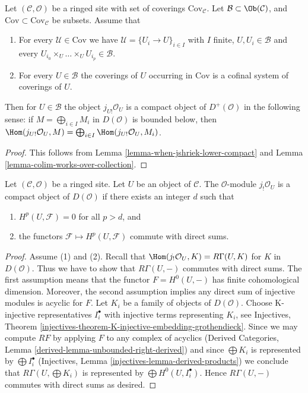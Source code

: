 \begin{lemma}
\label{lemma-when-jshriek-lower-compact-worked-out}
Let $(\mathcal{C}, \mathcal{O})$ be a ringed site
with set of coverings $\text{Cov}_\mathcal{C}$.
Let $\mathcal{B} \subset \Ob(\mathcal{C})$, and
$\text{Cov} \subset \text{Cov}_\mathcal{C}$
be subsets. Assume that
\begin{enumerate}
\item For every $\mathcal{U} \in \text{Cov}$ we have
$\mathcal{U} = \{U_i \to U\}_{i \in I}$ with $I$ finite,
$U, U_i \in \mathcal{B}$ and every
$U_{i_0} \times_U \ldots \times_U U_{i_p} \in \mathcal{B}$.
\item For every $U \in \mathcal{B}$ the coverings of $U$
occurring in $\text{Cov}$ is a cofinal system of coverings of $U$.
\end{enumerate}
Then for $U \in \mathcal{B}$ the object $j_{U!}\mathcal{O}_U$ is
a compact object of $D^+(\mathcal{O})$ in the following sense:
if $M = \bigoplus_{i \in I} M_i$ in $D(\mathcal{O})$ is
bounded below, then $\Hom(j_{U!}\mathcal{O}_U, M) =
\bigoplus_{i \in I} \Hom(j_{U!}\mathcal{O}_U, M_i)$.
\end{lemma}

\begin{proof}
This follows from Lemma \ref{lemma-when-jshriek-lower-compact}
and Lemma \ref{lemma-colim-works-over-collection}.
\end{proof}

\begin{lemma}
\label{lemma-when-jshriek-compact}
Let $(\mathcal{C}, \mathcal{O})$ be a ringed site. Let $U$ be an object of
$\mathcal{C}$. The $\mathcal{O}$-module $j_!\mathcal{O}_U$ is a
compact object of $D(\mathcal{O})$ if there exists an integer $d$ such that
\begin{enumerate}
\item $H^p(U, \mathcal{F}) = 0$ for all $p > d$, and
\item the functors $\mathcal{F} \mapsto H^p(U, \mathcal{F})$
commute with direct sums.
\end{enumerate}
\end{lemma}

\begin{proof}
Assume (1) and (2). Recall that $\Hom(j_!\mathcal{O}_U, K) = R\Gamma(U, K)$ for
$K$ in $D(\mathcal{O})$. Thus we have to show that $R\Gamma(U, -)$
commutes with direct sums. The first assumption means that the functor
$F = H^0(U, -)$ has finite cohomological dimension. Moreover, the second
assumption implies any direct sum of injective modules is acyclic for $F$.
Let $K_i$ be a family of objects of $D(\mathcal{O})$.
Choose K-injective representatives $I_i^\bullet$ with injective terms
representing $K_i$, see Injectives, Theorem
\ref{injectives-theorem-K-injective-embedding-grothendieck}.
Since we may compute $RF$ by applying $F$ to any complex of acyclics
(Derived Categories, Lemma \ref{derived-lemma-unbounded-right-derived})
and since $\bigoplus K_i$ is represented by $\bigoplus I_i^\bullet$
(Injectives, Lemma \ref{injectives-lemma-derived-products})
we conclude that $R\Gamma(U, \bigoplus K_i)$ is represented by
$\bigoplus H^0(U, I_i^\bullet)$. Hence $R\Gamma(U, -)$ commutes
with direct sums as desired.
\end{proof}

